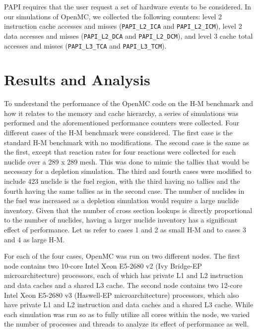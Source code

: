 \documentclass{mc2015}
\begin{document}
PAPI requires that the user request a set of hardware events to be
considered. In our simulations of OpenMC, we collected the following counters:
level 2 instruction cache accesses and misses (\texttt{PAPI\_L2\_ICA} and
\texttt{PAPI\_L2\_ICM}), level 2 data accesses and misses
(\texttt{PAPI\_L2\_DCA} and \texttt{PAPI\_L2\_DCM}), and level 3 cache total
accesses and misses (\texttt{PAPI\_L3\_TCA} and \linebreak
\texttt{PAPI\_L3\_TCM}).

\section{Results and Analysis}

To understand the performance of the OpenMC code on the H-M benchmark and how
it relates to the memory and cache hierarchy, a series of simulations was
performed and the aforementioned performance counters were collected. Four
different cases of the H-M benchmark were considered. The first case is the
standard H-M benchmark with no modifications. The second case is the same as
the first, except that reaction rates for four reactions were collected for
each nuclide over a 289 x 289 mesh. This was done to mimic the tallies that
would be necessary for a depletion simulation. The third and fourth cases were
modified to include 423 nuclide is the fuel region, with the third having no
tallies and the fourth having the same tallies as in the second case. The
number of nuclides in the fuel was increased as a depletion simulation would
require a large nuclide inventory. Given that the number of cross section
lookups is directly proportional to the number of nuclides, having a larger
nuclide inventory has a significant effect of performance. Let us refer to
cases 1 and 2 as small H-M and to cases 3 and 4 as large H-M.

For each of the four cases, OpenMC was run on two different nodes. The first
node contains two 10-core Intel Xeon E5-2680 v2 (Ivy Bridge-EP
microarchitecture) processors, each of which has private L1 and L2 instruction
and data caches and a shared L3 cache. The second node contains two 12-core
Intel Xeon E5-2680 v3 (Haswell-EP microarchitecture) processors, which also have
private L1 and L2 instruction and data caches and a shared L3 cache. While each
simulation was run so as to fully utilize all cores within the node, we varied
the number of processes and threads to analyze its effect of performance as
well.
\end{document}

